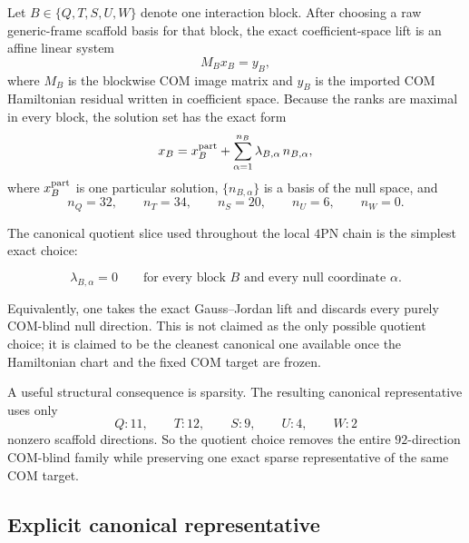 \documentclass[11pt]{article}
\begin{document}
Let \(B\in\{Q,T,S,U,W\}\) denote one interaction block.  After choosing a raw
generic-frame scaffold basis for that block, the exact coefficient-space lift is
an affine linear system
\begin{equation}
M_B x_B = y_B,
\label{eq:app-canonical-slice-linear-system}
\end{equation}
where \(M_B\) is the blockwise COM image matrix and \(y_B\) is the imported COM
Hamiltonian residual written in coefficient space.  Because the ranks are
maximal in every block, the solution set has the exact form
\begin{equation}
x_B
=
x_B^{\rm part}
+
\sum_{\alpha=1}^{n_B}\lambda_{B,\alpha}\,n_{B,\alpha},
\label{eq:app-canonical-slice-affine-family}
\end{equation}
where \(x_B^{\rm part}\) is one particular solution, \(\{n_{B,\alpha}\}\) is a
basis of the null space, and
\begin{equation}
n_Q=32,
\qquad
n_T=34,
\qquad
n_S=20,
\qquad
n_U=6,
\qquad
n_W=0.
\label{eq:app-canonical-slice-null-dims}
\end{equation}

The canonical quotient slice used throughout the local $4$PN chain is the
simplest exact choice:

\begin{equation}
\lambda_{B,\alpha}=0
\qquad
\text{for every block \(B\) and every null coordinate \(\alpha\).}
\label{eq:app-canonical-slice-choice}
\end{equation}

Equivalently, one takes the exact Gauss--Jordan lift and discards every purely
COM-blind null direction.  This is not claimed as the only possible quotient
choice; it is claimed to be the cleanest canonical one available once the
Hamiltonian chart and the fixed COM target are frozen.

A useful structural consequence is sparsity.  The resulting canonical
representative uses only
\begin{equation}
Q:11,
\qquad
T:12,
\qquad
S:9,
\qquad
U:4,
\qquad
W:2
\label{eq:app-canonical-slice-sparse-counts}
\end{equation}
nonzero scaffold directions.  So the quotient choice removes the entire
\(92\)-direction COM-blind family while preserving one exact sparse
representative of the same COM target.

\subsection{Explicit canonical representative}
\label{app:canonical-slice-explicit}
\end{document}

